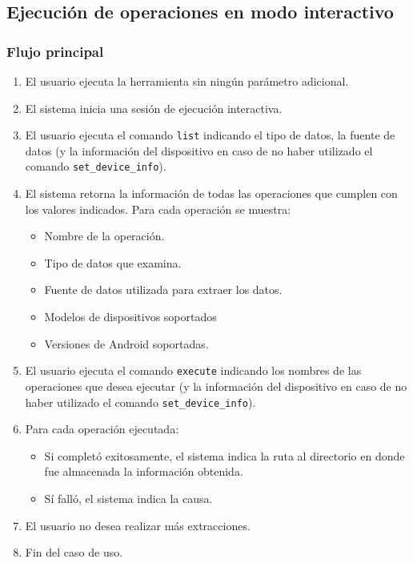 \subsection{Ejecución de operaciones en modo interactivo}

\subsubsection*{Flujo principal}
\begin{enumerate}
\item El usuario ejecuta la herramienta sin ningún parámetro adicional.
\item El sistema inicia una sesión de ejecución interactiva.
\item El usuario ejecuta el comando \texttt{list} indicando el tipo de datos, la fuente de datos (y la información del dispositivo en caso de no haber utilizado el comando \texttt{set\_device\_info}).
\item El sistema retorna la información de todas las operaciones que cumplen con los valores indicados. Para cada operación se muestra:
    \begin{itemize}
    \item Nombre de la operación.
    \item Tipo de datos que examina.
    \item Fuente de datos utilizada para extraer los datos.
    \item Modelos de dispositivos soportados
    \item Versiones de Android soportadas.
    \end{itemize}
\item El usuario ejecuta el comando \texttt{execute} indicando los nombres de las operaciones que desea ejecutar (y la información del dispositivo en caso de no haber utilizado el comando \texttt{set\_device\_info}).
\item Para cada operación ejecutada:
    \begin{itemize}
    \item Si completó exitosamente, el sistema indica la ruta al directorio en donde fue almacenada la información obtenida.
    \item Sí falló, el sistema indica la causa.
    \end{itemize}
\item El usuario no desea realizar más extracciones.
\item Fin del caso de uso.
\end{enumerate}

